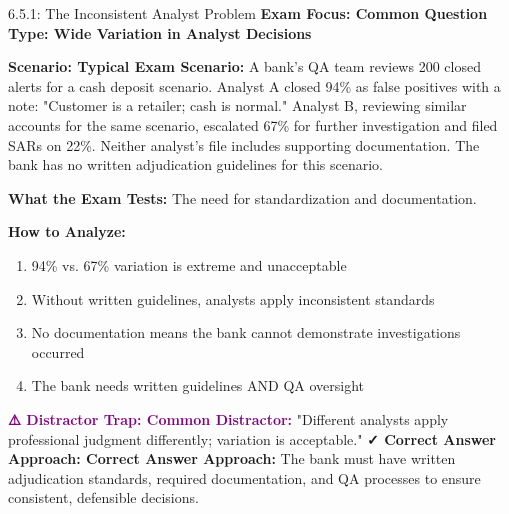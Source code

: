 \documentclass[11pt,a4paper]{beamer}
\newcommand{\examfocus}[1]{\textcolor{orange!80!black}{\textbf{Exam Focus: #1}}}
\newcommand{\trap}[1]{\textcolor{purple}{\textbf{⚠️ Distractor Trap: #1}}}
\newcommand{\correct}[1]{\textcolor{green!50!black}{\textbf{✓ Correct Answer Approach: #1}}}
\newcommand{\scenario}[1]{\textcolor{blue!70!black}{\textbf{Scenario: #1}}}
\begin{document}
	\begin{frame}{6.5.1: The Inconsistent Analyst Problem}
		\examfocus{Common Question Type: Wide Variation in Analyst Decisions}
		
		\scenario{Typical Exam Scenario:}
		A bank's QA team reviews 200 closed alerts for a cash deposit scenario. Analyst A closed 94\% as false positives with a note: "Customer is a retailer; cash is normal." Analyst B, reviewing similar accounts for the same scenario, escalated 67\% for further investigation and filed SARs on 22\%. Neither analyst's file includes supporting documentation. The bank has no written adjudication guidelines for this scenario.
		
		\textbf{What the Exam Tests:} The need for standardization and documentation.
		
		\textbf{How to Analyze:}
		\begin{enumerate}
			\item 94\% vs. 67\% variation is extreme and unacceptable
			\item Without written guidelines, analysts apply inconsistent standards
			\item No documentation means the bank cannot demonstrate investigations occurred
			\item The bank needs written guidelines AND QA oversight
		\end{enumerate}
		
		\trap{Common Distractor:} "Different analysts apply professional judgment differently; variation is acceptable."
		\correct{Correct Answer Approach:} The bank must have written adjudication standards, required documentation, and QA processes to ensure consistent, defensible decisions.
	\end{frame}
	
\end{document}
